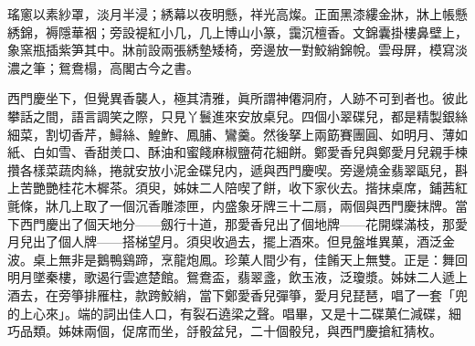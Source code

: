 \begin{myquote}
瑤窻以素紗罩，淡月半浸；綉幕以夜明懸，祥光高燦。正面黑漆縷金牀，牀上帳懸綉錦，褥隱華裀；旁設褆紅小几，几上博山小篆，靄沉檀香。文錦囊掛樓鼻壁上，象窯瓶插紫笋其中。牀前設兩張綉墊矮椅，旁邊放一對鮫綃錦帨。雲母屏，模寫淡濃之筆；鴛鴦榻，高閣古今之書。
\end{myquote}

西門慶坐下，但覺異香襲人，極其清雅，眞所謂神僊洞府，人跡不可到者也。彼此攀話之間，語言調笑之際，只見丫鬟進來安放桌兒。四個小翠碟兒，都是精製銀絲細菜，割切香芹，鱘絲、鰉鮓、鳳脯、鸞羹。然後拏上兩筯賽團圓、如明月、薄如紙、白如雪、香甜羙口、酥油和蜜餞麻椒鹽荷花細餅。鄭愛香兒與鄭愛月兒親手楝攢各樣菜蔬肉絲，捲就安放小泥金碟兒内，遞與西門慶喫。旁邊燒金翡翠甌兒，斟上苦艷艷桂花木樨茶。須臾，姊妹二人陪喫了餅，收下家伙去。揩抹桌席，鋪茜紅氈條，牀几上取了一個沉香雕漆匣，内盛象牙牌三十二扇，兩個與西門慶抹牌。當下西門慶出了個天地分——劔行十道，那愛香兒出了個地牌——花開蝶滿枝，那愛月兒出了個人牌——搭梯望月。須臾收過去，擺上酒來。但見盤堆異菓，酒泛金波。桌上無非是鵝鴨鷄蹄，烹龍炮鳳。珍菓人間少有，佳餚天上無雙。正是：舞回明月墜秦樓，歌遏行雲遮楚館。鴛鴦盃，翡翠盞，飲玉液，泛瓊漿。姊妹二人遞上酒去，在旁箏排雁柱，款跨鮫綃，當下鄭愛香兒彈箏，愛月兒琵琶，唱了一套「兜的上心來」。端的詞出佳人口，有裂石遶梁之聲。唱畢，又是十二碟菓仁減碟，細巧品類。姊妹兩個，促席而坐，㧱骰盆兒，二十個骰兒，與西門慶搶紅猜枚。

